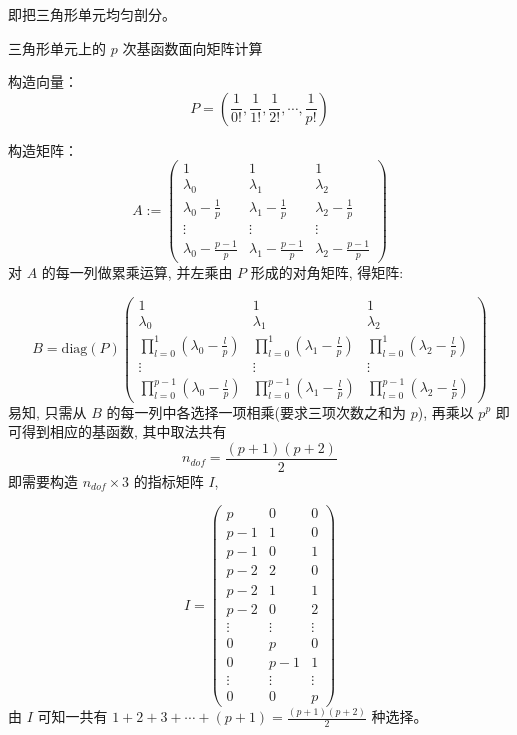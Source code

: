 \documentclass[12pt,a4paper]{article}
\begin{document}
即把三角形单元均匀剖分。

三角形单元上的 $p$ 次基函数面向矩阵计算

构造向量：
$$
P = ( \frac{1}{0!},  \frac{1}{1!}, \frac{1}{2!}, \cdots, \frac{1}{p!})
$$

构造矩阵：
$$
A :=                                                                            
\begin{pmatrix}  
1  &  1  & 1 \\
\lambda_0 & \lambda_1 & \lambda_2\\                                             
\lambda_0 - \frac{1}{p} & \lambda_1 - \frac{1}{p} & \lambda_2 - \frac{1}{p}\\   
\vdots & \vdots & \vdots \\                                                     
\lambda_0 - \frac{p - 1}{p} & \lambda_1 - \frac{p - 1}{p} & \lambda_2 - \frac{p - 1}{p}
\end{pmatrix}                                                                   
$$ 
对 $A$ 的每一列做累乘运算, 并左乘由 $P$ 形成的对角矩阵, 得矩阵:

$$
B = \mathrm{diag}(P)
\begin{pmatrix}
1 & 1 & 1 \\
\lambda_0 & \lambda_1 & \lambda_2\\
\prod_{l=0}^{1}(\lambda_0 - \frac{l}{p}) & \prod_{l=0}^{1}(\lambda_1 - \frac{l}{p})
& \prod_{l=0}^{1}(\lambda_2 - \frac{l}{p}) \\
\vdots & \vdots & \vdots \\
\prod_{l=0}^{p-1}(\lambda_0 - \frac{l}{p}) & \prod_{l=0}^{p-1}(\lambda_1 - \frac{l}{p})
& \prod_{l=0}^{p-1}(\lambda_2 - \frac{l}{p}) 
\end{pmatrix}
$$
易知, 只需从 $B$ 的每一列中各选择一项相乘(要求三项次数之和为 $p$), 再乘以 $p^p$ 即可得到相应的基函数, 其中取法共有 
$$
n_{dof} = \frac{(p+1)(p+2)}{2}
$$
即需要构造 $n_{dof}\times 3$ 的指标矩阵 $I$, 

$$
I = \begin{pmatrix}
p & 0 & 0 \\
p-1 & 1 & 0 \\
p-1 & 0 & 1 \\
p-2 & 2 & 0 \\
p-2 & 1 & 1 \\
p-2 & 0 & 2 \\
\vdots & \vdots & \vdots \\
0   & p & 0 \\
0   & p-1 & 1\\
\vdots & \vdots & \vdots \\
0   & 0  & p
\end{pmatrix}
$$
由 $I$ 可知一共有 $1+2+3+\cdots+(p+1)=\frac{(p+1)(p+2)}{2}$ 种选择。
\end{document}
